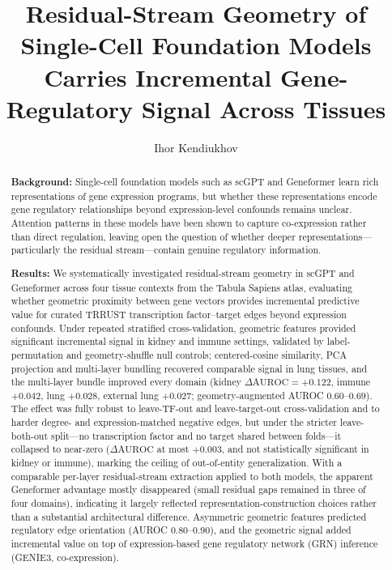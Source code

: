 \documentclass[11pt]{article}
\title{Residual-Stream Geometry of Single-Cell Foundation Models\\Carries Incremental Gene-Regulatory Signal Across Tissues}
\author[1]{Ihor Kendiukhov}
\affil[1]{University of T\"ubingen, T\"ubingen, Germany}
\affil[1]{Correspondence: \texttt{ihor.kendiukhov@student.uni-tuebingen.de}}
\date{}
\newcommand{\DAURC}{\Delta\mathrm{AUROC}}
\begin{document}
\maketitle

\begin{abstract}
\textbf{Background:}
Single-cell foundation models such as scGPT and Geneformer learn rich representations of gene expression programs, but whether these representations encode gene regulatory relationships beyond expression-level confounds remains unclear.
Attention patterns in these models have been shown to capture co-expression rather than direct regulation, leaving open the question of whether deeper representations---particularly the residual stream---contain genuine regulatory information.

\textbf{Results:}
We systematically investigated residual-stream geometry in scGPT and Geneformer across four tissue contexts from the Tabula Sapiens atlas, evaluating whether geometric proximity between gene vectors provides incremental predictive value for curated TRRUST transcription factor--target edges beyond expression confounds.
Under repeated stratified cross-validation, geometric features provided significant incremental signal in kidney and immune settings, validated by label-permutation and geometry-shuffle null controls; centered-cosine similarity, PCA projection and multi-layer bundling recovered comparable signal in lung tissues, and the multi-layer bundle improved every domain (kidney $\DAURC=+0.122$, immune $+0.042$, lung $+0.028$, external lung $+0.027$; geometry-augmented AUROC $0.60$--$0.69$).
The effect was fully robust to leave-TF-out and leave-target-out cross-validation and to harder degree- and expression-matched negative edges, but under the stricter leave-both-out split---no transcription factor and no target shared between folds---it collapsed to near-zero ($\DAURC$ at most $+0.003$, and not statistically significant in kidney or immune), marking the ceiling of out-of-entity generalization.
With a comparable per-layer residual-stream extraction applied to both models, the apparent Geneformer advantage mostly disappeared (small residual gaps remained in three of four domains), indicating it largely reflected representation-construction choices rather than a substantial architectural difference.
Asymmetric geometric features predicted regulatory edge orientation (AUROC $0.80$--$0.90$), and the geometric signal added incremental value on top of expression-based gene regulatory network (GRN) inference (GENIE3, co-expression).


\end{abstract}
\end{document}
